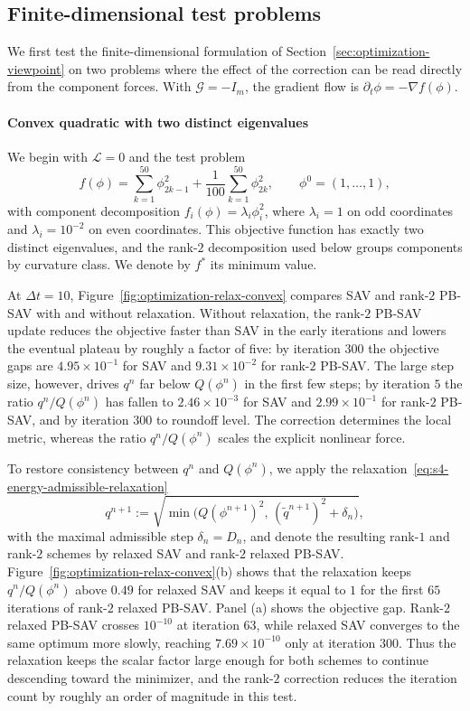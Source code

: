 \documentclass[10pt,onefignum,onetabnum,hidelinks]{siamart251216}
\begin{document}
\subsection{Finite-dimensional test problems}
\label{subsec:exp-optimization}

We first test the finite-dimensional formulation of Section~\ref{sec:optimization-viewpoint} on two problems where the effect of the correction can be read directly from the component forces.  With $\mathcal G=-I_m$, the gradient flow is $\partial_t\phi=-\nabla f(\phi)$. 

\paragraph{Convex quadratic with two distinct eigenvalues}
We begin with $\mathcal L=0$ and the test problem
\begin{equation}
f(\phi)
=
\sum_{k=1}^{50}\phi_{2k-1}^2
+ \frac{1}{100}\sum_{k=1}^{50}\phi_{2k}^2,
\qquad
\phi^0=(1,\ldots,1),
\label{eq:s6-opt-quadratic}
\end{equation}
with component decomposition $f_i(\phi)=\lambda_i \phi_i^2$, where $\lambda_i=1$ on odd coordinates and $\lambda_i=10^{-2}$ on even coordinates.  This objective function has exactly two distinct eigenvalues, and the rank-$2$ decomposition used below groups components by curvature class. We denote by $f^*$ its minimum value.

At $\Delta t=10$, Figure~\ref{fig:optimization-relax-convex} compares SAV and rank-$2$ PB-SAV with and without relaxation. Without relaxation, the rank-$2$ PB-SAV update reduces the objective faster than SAV in the early iterations and lowers the eventual plateau by roughly a factor of five: by iteration $300$ the objective gaps are $4.95\times10^{-1}$ for SAV and $9.31\times10^{-2}$ for rank-$2$ PB-SAV. The large step size, however, drives $q^n$ far below $Q(\phi^n)$ in the first few steps; by iteration $5$ the ratio $q^n/Q(\phi^n)$ has fallen to $2.46\times10^{-3}$ for SAV and $2.99\times10^{-1}$ for rank-$2$ PB-SAV, and by iteration $300$ to roundoff level. The correction determines the local metric, whereas the ratio $q^n/Q(\phi^n)$ scales the explicit nonlinear force.

To restore consistency between $q^n$ and $Q(\phi^n)$, we apply the relaxation~\eqref{eq:s4-energy-admissible-relaxation}
\[
q^{n+1}
:=
\sqrt{\min\bigl(Q(\phi^{n+1})^2,\,(\widetilde q^{n+1})^2+\delta_n\bigr)},
\]
with the maximal admissible step $\delta_n=D_n$, and denote the resulting rank-$1$ and rank-$2$ schemes by relaxed SAV and rank-$2$ relaxed PB-SAV. Figure~\ref{fig:optimization-relax-convex}(b) shows that the relaxation keeps $q^n/Q(\phi^n)$ above $0.49$ for relaxed SAV and keeps it equal to $1$ for the first $65$ iterations of rank-$2$ relaxed PB-SAV. Panel (a) shows the objective gap. Rank-$2$ relaxed PB-SAV crosses $10^{-10}$ at iteration $63$, while relaxed SAV converges to the same optimum more slowly, reaching $7.69\times10^{-10}$ only at iteration $300$. Thus the relaxation keeps the scalar factor large enough for both schemes to continue descending toward the minimizer, and the rank-$2$ correction reduces the iteration count by roughly an order of magnitude in this test.
\end{document}
